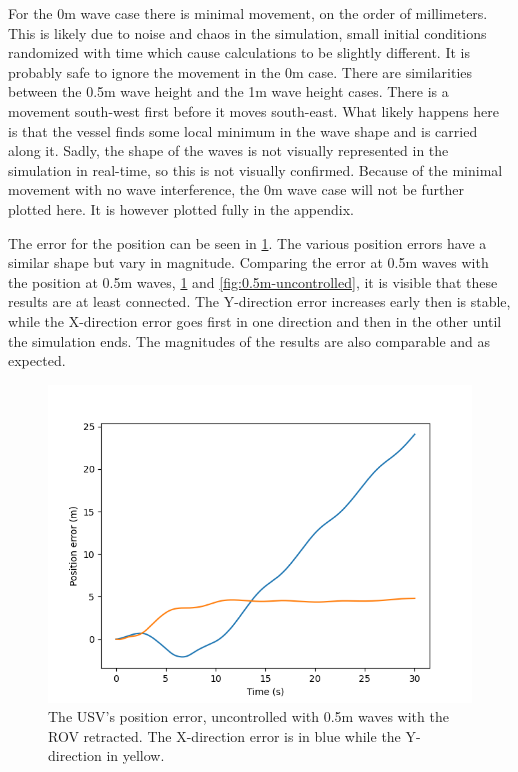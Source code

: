 \documentclass[class=article, crop=false]{standalone}
\begin{document}
For the 0m wave case there is minimal movement, on the order of millimeters. This is likely due to noise and chaos in the simulation, small initial conditions randomized with time which cause calculations to be slightly different. It is probably safe to ignore the movement in the 0m case. There are similarities between the 0.5m wave height and the 1m wave height cases. There is a movement south-west first before it moves south-east. What likely happens here is that the vessel finds some local minimum in the wave shape and is carried along it. Sadly, the shape of the waves is not visually represented in the simulation in real-time, so this is not visually confirmed. Because of the minimal movement with no wave interference, the 0m wave case will not be further plotted here. It is however plotted fully in the appendix.

The error for the position can be seen in \cref{fig:position_errors}. The various position errors have a similar shape but vary in magnitude. Comparing the error at 0.5m waves with the position at 0.5m waves, \cref{fig:position_errors} and \cref{fig:0.5m-uncontrolled}, it is visible that these results are at least connected. The Y-direction error increases early then is stable, while the X-direction error goes first in one direction and then in the other until the simulation ends. The magnitudes of the results are also comparable and as expected.

\begin{figure}
    \centering
    \includegraphics{scenario1/rov-0m/0.5m/usv_pos_error_uncontrolled}
    \caption{The USV's position error, uncontrolled with 0.5m waves with the ROV retracted. The X-direction error is in blue while the Y-direction in yellow.}
    \label{fig:position_errors}
\end{figure}
\end{document}
